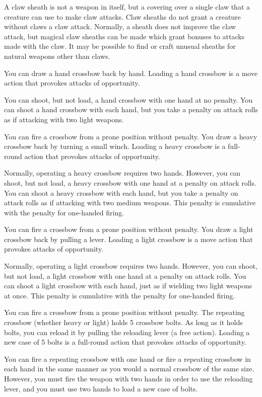  A claw sheath is not a weapon in itself, but a covering over a single claw that a creature can use to make claw attacks. Claw sheaths do not grant a creature without claws a claw attack. Normally, a sheath does not improve the claw attack, but magical claw sheaths can be made which grant bonuses to attacks made with the claw. It may be possible to find or craft unusual sheaths for natural weapons other than claws.

 You can draw a hand crossbow back by hand. Loading a hand crossbow is a move action that provokes attacks of opportunity.
\par You can shoot, but not load, a hand crossbow with one hand at no penalty. You can shoot a hand crossbow with each hand, but you take a penalty on attack rolls as if attacking with two light weapons.
\par You can fire a crossbow from a prone position without penalty.
 You draw a heavy crossbow back by turning a small winch. Loading a heavy crossbow is a full-round action that provokes attacks of opportunity.
\par Normally, operating a heavy crossbow requires two hands. However, you can shoot, but not load, a heavy crossbow with one hand at a  penalty on attack rolls. You can shoot a heavy crossbow with each hand, but you take a penalty on attack rolls as if attacking with two medium weapons. This penalty is cumulative with the penalty for one-handed firing.
\par You can fire a crossbow from a prone position without penalty.
 You draw a light crossbow back by pulling a lever. Loading a light crossbow is a move action that provokes attacks of opportunity.
\par Normally, operating a light crossbow requires two hands. However, you can shoot, but not load, a light crossbow with one hand at a  penalty on attack rolls. You can shoot a light crossbow with each hand, just as if wielding two light weapons at once. This penalty is cumulative with the penalty for one-handed firing.
\par You can fire a crossbow from a prone position without penalty.
 The repeating crossbow (whether heavy or light) holds 5 crossbow bolts. As long as it holds bolts, you can reload it by pulling the reloading lever (a free action). Loading a new case of 5 bolts is a full-round action that provokes attacks of opportunity.
\par You can fire a repeating crossbow with one hand or fire a repeating crossbow in each hand in the same manner as you would a normal crossbow of the same size. However, you must fire the weapon with two hands in order to use the reloading lever, and you must use two hands to load a new case of bolts.
